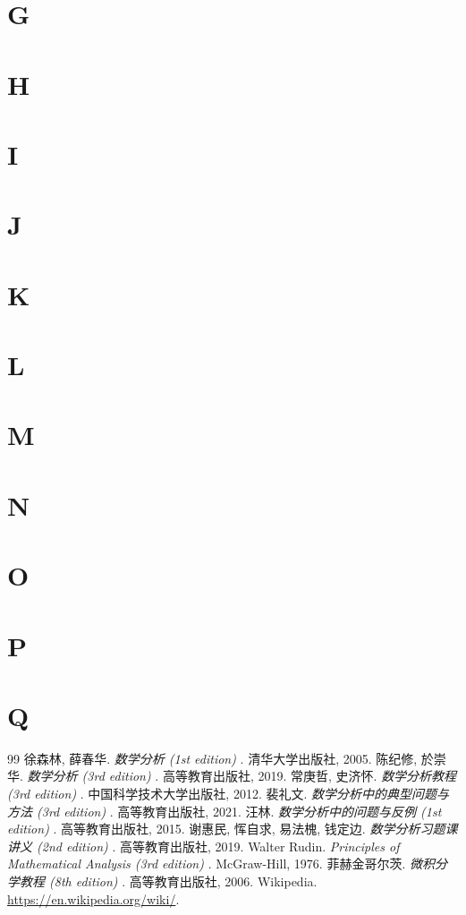 \documentclass[11pt]{../../TexTemplate/elegantbook}
\begin{document}
\section*{G} %
\section*{H} %
\section*{I} %
\section*{J} %
\section*{K} %
\section*{L} %
\section*{M} %
\section*{N} %
\section*{O} %
\section*{P} %
\section*{Q} %



\begin{thebibliography}{99} 
 徐森林, 薛春华. \emph{数学分析 (1st edition) }. 清华大学出版社, 2005.
 陈纪修, 於崇华. \emph{数学分析 (3rd edition) }. 高等教育出版社, 2019.
 常庚哲, 史济怀. \emph{数学分析教程 (3rd edition) }. 中国科学技术大学出版社, 2012.
 裴礼文. \emph{数学分析中的典型问题与方法 (3rd edition) }. 高等教育出版社, 2021.
 汪林. \emph{数学分析中的问题与反例 (1st edition) }. 高等教育出版社, 2015.
 谢惠民, 恽自求, 易法槐, 钱定边. \emph{数学分析习题课讲义 (2nd edition) }. 高等教育出版社, 2019.
 Walter Rudin. \emph{Principles of Mathematical Analysis (3rd edition) }. McGraw-Hill, 1976.
 菲赫金哥尔茨. \emph{微积分学教程 (8th edition) }. 高等教育出版社, 2006.
 Wikipedia. \url{https://en.wikipedia.org/wiki/}.
\end{thebibliography}
\end{document}
